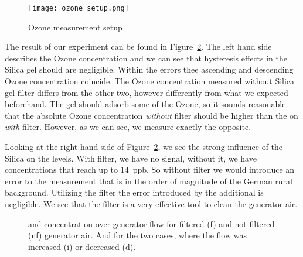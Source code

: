 \begin{figure}[htbp]
  \centering
  \texttt{[image: ozone\_setup.png]}
  \caption{Ozone measurement setup}
  \label{fig:ozone-flow-setup}
\end{figure}

The result of our experiment can be found in
Figure~\ref{fig:o3-flow}. The left hand side describes the Ozone
concentration and we can see that hysteresis effects in the Silica gel
should are negligible. Within the errors thee ascending and descending
Ozone concentration coincide. The Ozone concentration measured without
Silica gel filter differs from the other two, however differently from
what we expected beforehand. The gel should adsorb some of the Ozone,
so it sounds reasonable that the absolute Ozone concentration
\emph{without} filter should be higher than the on \emph{with}
filter. However, as we can see, we measure exactly the opposite. 

Looking at the right hand side of Figure~\ref{fig:o3-flow}, we see the
strong influence of the Silica on the  levels. With filter, we
have no  signal, without it, we have concentrations that reach
up to \SI{14}{ppb}. So without filter we would introduce an error to
the  measurement that is in the order of magnitude of the
German rural background. Utilizing the filter the error
introduced by the additional  is negligible. We see that the
filter is a very effective tool to clean the generator air.

\begin{figure}[htbp]
  \centering
  
  \hfill
  
  \caption{ and  concentration over generator flow for
    filtered (f) and not filtered (nf) generator air. And for the two
    cases, where the flow was increased (i) or decreased (d).}
  \label{fig:o3-flow}
\end{figure}

